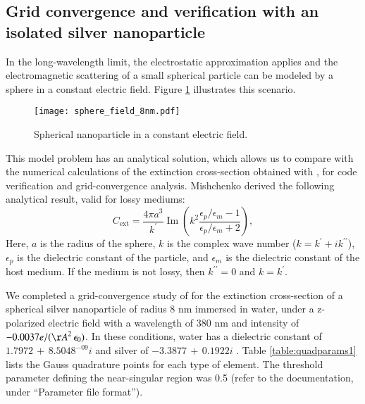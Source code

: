 
\subsection{Grid convergence and verification with an isolated silver nanoparticle} \label{sec:verification}

\noindent In the long-wavelength limit, the electrostatic approximation applies and
the electromagnetic scattering of a small spherical particle can be modeled
by a sphere in a constant electric field. 
Figure \ref{fig:np_elec_field} illustrates this scenario.

%
\begin{figure}[h] %
   \centering
   \texttt{[image: sphere\_field\_8nm.pdf]} 
   \caption{Spherical nanoparticle in a constant electric field.}
   \label{fig:np_elec_field}
\end{figure}
%

This model problem has an analytical solution, which allows us to compare with
the numerical calculations of the extinction cross-section obtained with \pygbe,
for code verification and grid-convergence analysis.
Mishchenko \cite{Mishchenko2007} derived the following analytical result, 
valid for lossy mediums:
%
\begin{equation} 
    C_\text{ext} = \frac{4\pi a^3}{k^\prime} \operatorname{Im}\left(k^2 
                    \frac{\epsilon_p/\epsilon_m -1}{\epsilon_p/\epsilon_m +2}\right),
    \label{eq:an_sol}
\end{equation}
%
Here, $a$ is the radius of the sphere, $k$ is the complex wave number ($k=k^\prime +i k^{\prime\prime}$), $\epsilon_p$ 
is the dielectric constant of the particle, and $\epsilon_m$ is the dielectric constant
of the host medium. If the medium is not lossy, then $k^{\prime\prime}=0$ and $k=k^\prime$.

We completed a grid-convergence study of \pygbe for the extinction
cross-section of a spherical silver nanoparticle of radius 8 nm immersed in water,
under a z-polarized electric field with a wavelength of 380 nm and intensity of 
$-0.0037 e/({\AA}^2 \, \epsilon_0)$. In these conditions, water has a dielectric
constant of $1.7972 \, + \, 8.5048^{-09}i$ \cite{JohnsonChristy1972} and silver of
$-3.3877 \, + \, 0.1922i$ \cite{HaleQuerry1972}. 
Table \ref{table:quadparams1} lists the Gauss quadrature points for each type of element. 
The threshold parameter defining the near-singular region was 0.5 (refer to the \pygbe documentation, under ``Parameter file format'').

